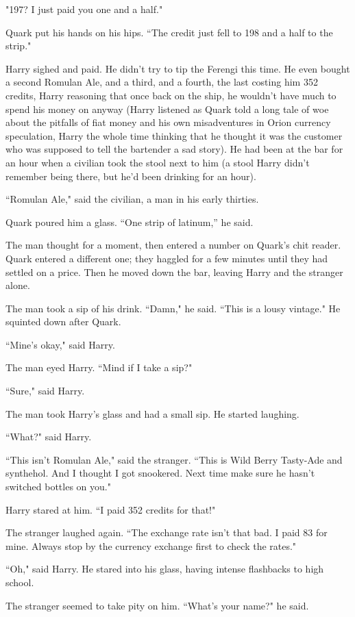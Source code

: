 \documentclass[twoside,letterpaper,12pt]{memoir}
\begin{document}
"197? I just paid you one and a half."

Quark put his hands on his hips. ``The credit just fell to 198 and a half to the strip."

Harry sighed and paid. He didn't try to tip the Ferengi this time. He even bought a second Romulan Ale, and a third, and a fourth, the last costing him 352 credits, Harry reasoning that once back on the ship, he wouldn't have much to spend his money on anyway (Harry listened as Quark told a long tale of woe about the pitfalls of fiat money and his own misadventures in Orion currency speculation, Harry the whole time thinking that he thought it was the customer who was supposed to tell the bartender a sad story). He had been at the bar for an hour when a civilian took the stool next to him (a stool Harry didn't remember being there, but he'd been drinking for an hour).

``Romulan Ale," said the civilian, a man in his early thirties.

Quark poured him a glass. ``One strip of latinum,'' he said.

The man thought for a moment, then entered a number on Quark's chit reader. Quark entered a different one; they haggled for a few minutes until they had settled on a price. Then he moved down the bar, leaving Harry and the stranger alone.

The man took a sip of his drink. ``Damn," he said. ``This is a lousy vintage." He squinted down after Quark.

``Mine's okay," said Harry.

The man eyed Harry. ``Mind if I take a sip?"

``Sure," said Harry.

The man took Harry's glass and had a small sip. He started laughing.

``What?" said Harry.

``This isn't Romulan Ale," said the stranger. ``This is Wild Berry Tasty-Ade and synthehol. And I thought I got snookered. Next time make sure he hasn't switched bottles on you."

Harry stared at him. ``I paid 352 credits for that!"

The stranger laughed again. ``The exchange rate isn't that bad. I paid 83 for mine. Always stop by the currency exchange first to check the rates."

``Oh," said Harry. He stared into his glass, having intense flashbacks to high school.

The stranger seemed to take pity on him. ``What's your name?" he said.
\end{document}
